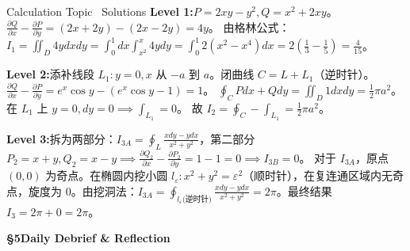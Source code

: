 \documentclass[a4paper,11pt]{article}
\begin{document}
\begin{solution}{Calculation Topic \textperiodcentered\ Solutions}
\textbf{Level 1:}\enspace $P = 2xy - y^2, Q = x^2 + 2xy$。$\frac{\partial Q}{\partial x} - \frac{\partial P}{\partial y} = (2x+2y) - (2x-2y) = 4y$。
由格林公式：$I_1 = \iint_D 4y dxdy = \int_0^1 dx \int_{x^2}^x 4y dy = \int_0^1 2(x^2 - x^4)dx = 2(\frac{1}{3} - \frac{1}{5}) = \frac{4}{15}$。

\vspace{1.5mm}
\textbf{Level 2:}\enspace 添补线段 $L_1: y=0, x$ 从 $-a$ 到 $a$。闭曲线 $C = L + L_1$（逆时针）。
$\frac{\partial Q}{\partial x} - \frac{\partial P}{\partial y} = e^x\cos y - (e^x\cos y - 1) = 1$。
$\oint_C Pdx+Qdy = \iint_D 1 dxdy = \frac{1}{2}\pi a^2$。在 $L_1$ 上 $y=0, dy=0 \implies \int_{L_1} = 0$。
故 $I_2 = \oint_C - \int_{L_1} = \frac{1}{2}\pi a^2$。

\vspace{1.5mm}
\textbf{Level 3:}\enspace 拆为两部分：$I_{3A} = \oint_L \frac{xdy - ydx}{x^2+y^2}$，第二部分 $P_2 = x+y, Q_2 = x-y \implies \frac{\partial Q_2}{\partial x} - \frac{\partial P_2}{\partial y} = 1 - 1 = 0 \implies I_{3B} = 0$。
对于 $I_{3A}$，原点 $(0,0)$ 为奇点。在椭圆内挖小圆 $l_\varepsilon: x^2+y^2=\varepsilon^2$（顺时针），在复连通区域内无奇点，旋度为 0。由挖洞法：$I_{3A} = \oint_{l_\varepsilon \text{(逆时针)}} \frac{xdy-ydx}{x^2+y^2} = 2\pi$。最终结果 $I_3 = 2\pi + 0 = 2\pi$。
\end{solution}

\clearpage

{\Large\sffamily\bfseries\color{navy} \S 5\quad Daily Debrief \& Reflection}

\vspace{6pt}
\end{document}
